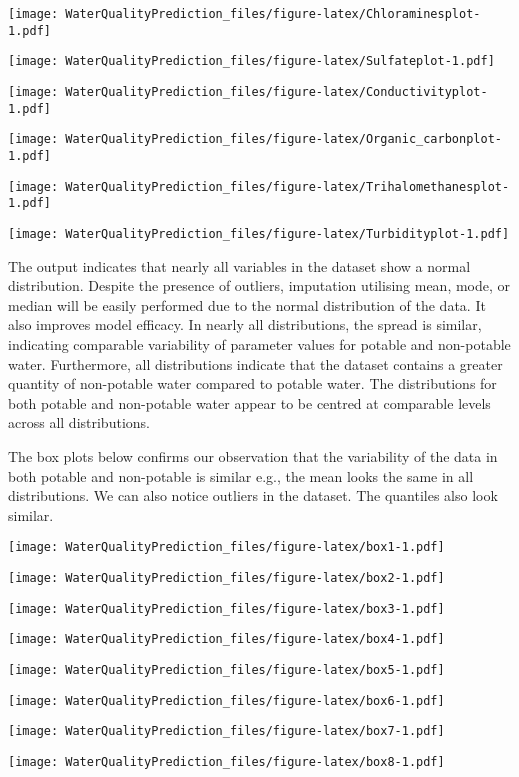 \documentclass[
]{article}
\begin{document}
\texttt{[image: WaterQualityPrediction\_files/figure-latex/Chloraminesplot-1.pdf]}

\texttt{[image: WaterQualityPrediction\_files/figure-latex/Sulfateplot-1.pdf]}

\texttt{[image: WaterQualityPrediction\_files/figure-latex/Conductivityplot-1.pdf]}

\texttt{[image: WaterQualityPrediction\_files/figure-latex/Organic\_carbonplot-1.pdf]}

\texttt{[image: WaterQualityPrediction\_files/figure-latex/Trihalomethanesplot-1.pdf]}

\texttt{[image: WaterQualityPrediction\_files/figure-latex/Turbidityplot-1.pdf]}

The output indicates that nearly all variables in the dataset show a
normal distribution. Despite the presence of outliers, imputation
utilising mean, mode, or median will be easily performed due to the
normal distribution of the data. It also improves model efficacy. In
nearly all distributions, the spread is similar, indicating comparable
variability of parameter values for potable and non-potable water.
Furthermore, all distributions indicate that the dataset contains a
greater quantity of non-potable water compared to potable water. The
distributions for both potable and non-potable water appear to be
centred at comparable levels across all distributions.

The box plots below confirms our observation that the variability of the
data in both potable and non-potable is similar e.g., the mean looks the
same in all distributions. We can also notice outliers in the dataset.
The quantiles also look similar.

\texttt{[image: WaterQualityPrediction\_files/figure-latex/box1-1.pdf]}

\texttt{[image: WaterQualityPrediction\_files/figure-latex/box2-1.pdf]}

\texttt{[image: WaterQualityPrediction\_files/figure-latex/box3-1.pdf]}

\texttt{[image: WaterQualityPrediction\_files/figure-latex/box4-1.pdf]}

\texttt{[image: WaterQualityPrediction\_files/figure-latex/box5-1.pdf]}

\texttt{[image: WaterQualityPrediction\_files/figure-latex/box6-1.pdf]}

\texttt{[image: WaterQualityPrediction\_files/figure-latex/box7-1.pdf]}

\texttt{[image: WaterQualityPrediction\_files/figure-latex/box8-1.pdf]}
\end{document}
